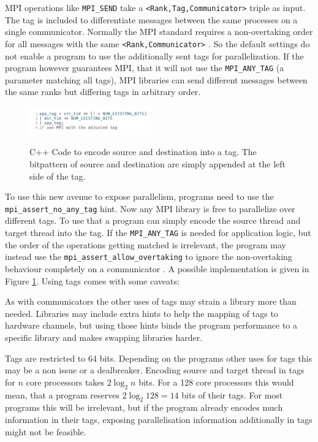 \documentclass[sigconf]{acmart}
\begin{document}
MPI operations like \verb|MPI_SEND| take a \verb|<Rank,Tag,Communicator>| triple as input.
The tag is included to differentiate messages between the same processes on a single communicator.
Normally the MPI standard requires a non-overtaking order for all messages with the same \verb|<Rank,Communicator>| \cite{mpi40}.
So the default settings do not enable a program to use the additionally sent tags for parallelization.
If the program however guarantees MPI, that it will not use the \verb|MPI_ANY_TAG| (a parameter matching all tags), MPI libraries can send different messages between the same ranks but differing tags in arbitrary order.


\begin{figure}
    \caption{
        C++ Code to encode source and destination into a tag.
        The bitpattern of source and destination are simply appended at the left side of the tag.
    }
    \includegraphics[width=0.47\textwidth]{Tags_CPP.png}
    \label{fig:Tags_CPP}
\end{figure}

To use this new avenue to expose parallelism, programs need to use the \verb|mpi_assert_no_any_tag| hint.
Now any MPI library is free to parallelize over different tags.
To use that a program can simply encode the source thread and target thread into the tag.
If the \verb|MPI_ANY_TAG| is needed for application logic, but the order of the operations getting matched is irrelevant, the program may instead use the \verb|mpi_assert_allow_overtaking| to ignore the non-overtaking behaviour completely on a communicator \cite{mpi40}.
A possible implementation is given in Figure \ref{fig:Tags_CPP}.
Using tags comes with some caveats:

As with communicators the other uses of tags may strain a library more than needed.
Libraries may include extra hints to help the mapping of tags to hardware channels, but using those hints binds the program performance to a specific library and makes swapping libraries harder.

Tags are restricted to 64 bits.
Depending on the programs other uses for tags this may be a non issue or a dealbreaker.
Encoding source and target thread in tags for $n$ core processors takes $2\log_2{n}$ bits.
For a 128 core processors this would mean, that a program reserves $2\log_2{128} = 14$ bits of their tags.
For most programs this will be irrelevant, but if the program already encodes much information in their tags, exposing parallelisation information additionally in tags might not be feasible.
\end{document}
